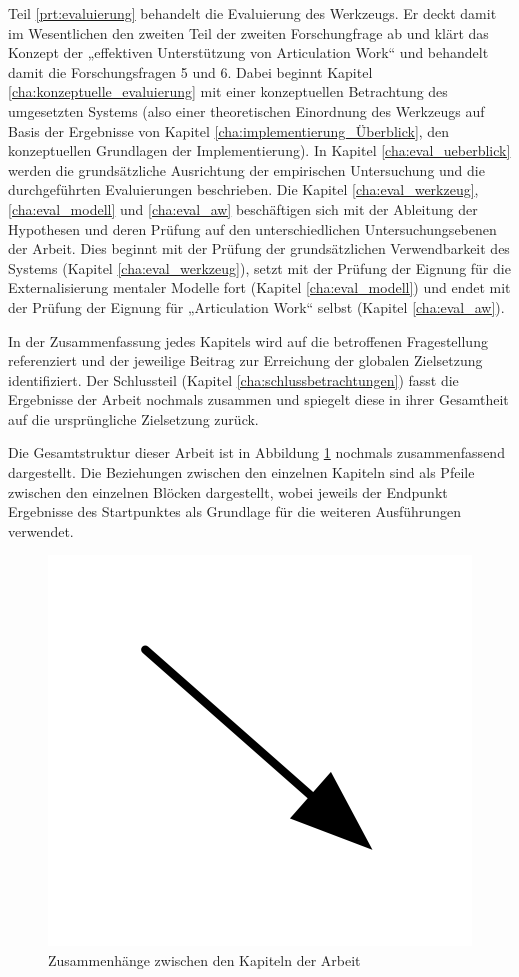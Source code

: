 Teil \ref{prt:evaluierung} behandelt die Evaluierung des Werkzeugs. Er deckt damit im Wesentlichen den zweiten Teil der zweiten Forschungfrage ab und klärt das Konzept der „effektiven Unterstützung von Articulation Work“ und behandelt damit die Forschungsfragen 5 und 6. Dabei beginnt Kapitel \ref{cha:konzeptuelle_evaluierung} mit einer konzeptuellen Betrachtung des umgesetzten Systems (also einer theoretischen Einordnung des Werkzeugs auf Basis der Ergebnisse von Kapitel \ref{cha:implementierung_Überblick}, den konzeptuellen Grundlagen der Implementierung). In Kapitel \ref{cha:eval_ueberblick} werden die grundsätzliche Ausrichtung der empirischen Untersuchung und die durchgeführten Evaluierungen beschrieben. Die Kapitel \ref{cha:eval_werkzeug}, \ref{cha:eval_modell} und \ref{cha:eval_aw} beschäftigen sich mit der Ableitung der Hypothesen und deren Prüfung auf den unterschiedlichen Untersuchungsebenen der Arbeit. Dies beginnt mit der Prüfung der grundsätzlichen Verwendbarkeit des Systems (Kapitel \ref{cha:eval_werkzeug}), setzt mit der Prüfung der Eignung für die Externalisierung mentaler Modelle fort (Kapitel \ref{cha:eval_modell}) und endet mit der Prüfung der Eignung für „Articulation Work“ selbst (Kapitel \ref{cha:eval_aw}).

In der Zusammenfassung jedes Kapitels wird auf die betroffenen Fragestellung referenziert und der jeweilige Beitrag zur Erreichung der globalen Zielsetzung identifiziert. Der Schlussteil (Kapitel \ref{cha:schlussbetrachtungen}) fasst die Ergebnisse der Arbeit nochmals zusammen und spiegelt diese in ihrer Gesamtheit auf die ursprüngliche Zielsetzung zurück.

Die Gesamtstruktur dieser Arbeit ist in Abbildung \ref{fig:img_Einfuehrung_gesamtueberblick} nochmals zusammenfassend dargestellt. Die Beziehungen zwischen den einzelnen Kapiteln sind als Pfeile zwischen den einzelnen Blöcken dargestellt, wobei jeweils der Endpunkt Ergebnisse des Startpunktes als Grundlage für die weiteren Ausführungen verwendet.

\begin{figure}[htbp]
	\centering
		\includegraphics[height=0.9\textheight]{img/Einfuehrung/gesamtueberblick.png}
	\caption{Zusammenhänge zwischen den Kapiteln der Arbeit}
	\label{fig:img_Einfuehrung_gesamtueberblick}
\end{figure}

